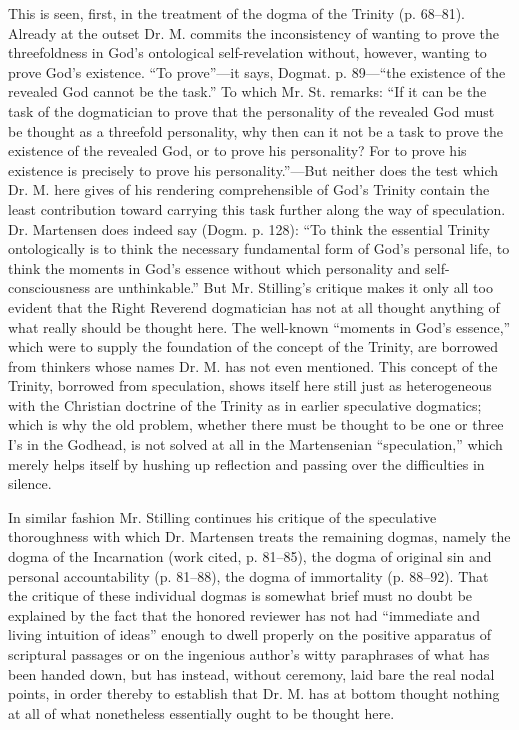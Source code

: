 \documentclass[12pt,a4paper,openany]{book}
\newcommand{\opage}[1]{\marginnote{\footnotesize\textit{[#1]}}}
\begin{document}
This is seen, first, in the treatment of the dogma of the Trinity
(p. 68--81). Already at the outset Dr.
M. commits the inconsistency of wanting to prove the threefoldness in God's
ontological self-revelation without, however, wanting to prove God's
existence. ``To prove''---it says, Dogmat. p. 89---``the
existence of the revealed God cannot be the task.''
To which Mr. St. remarks: ``If it can be the task of
the dogmatician to prove that the personality of the revealed God
must be thought as a threefold personality, why then can
it not be a task to prove the existence of the revealed God,
or to prove his personality? For to prove his
existence is precisely to prove his personality.''---But neither
does the test which Dr. M. here gives of his rendering comprehensible
of God's Trinity contain the least contribution toward
carrying this task further along the way of speculation. Dr. Martensen
does indeed say (Dogm. p. 128): ``To think the essential Trinity
ontologically is to think the necessary fundamental form
\setcounter{footnote}{0}%
\opage{23}of God's personal life, to think the moments in God's
essence without which personality and self-consciousness are unthinkable.''
But Mr. Stilling's critique makes it only all too evident
that the Right Reverend dogmatician has not at all
thought anything of what really should be thought here. The well-known
``moments in God's essence,'' which were to supply the foundation of the concept of the Trinity,
are borrowed from thinkers whose
names Dr. M. has not even mentioned. This concept of the Trinity,
borrowed from speculation, shows itself here still just as
heterogeneous with the Christian doctrine of the Trinity as in earlier
speculative dogmatics; which is why the old
problem, whether there must be thought to be one or three
I's in the Godhead, is not solved at all in the Martensenian
``speculation,'' which merely helps itself by hushing up reflection
and passing over the difficulties in silence.

In similar fashion Mr. Stilling continues his critique
of the speculative thoroughness with which Dr. Martensen
treats the remaining dogmas, namely the dogma of the Incarnation
(work cited, p. 81--85), the dogma of original sin and personal
accountability (p. 81--88), the dogma of immortality
(p. 88--92). That the critique of these individual dogmas is
somewhat brief must no doubt be explained by the fact that the honored
reviewer has not had ``immediate and living intuition of ideas''
enough to dwell properly on the positive apparatus of
scriptural passages or on the ingenious author's witty paraphrases
of what has been handed down, but has instead, without ceremony,
laid bare the real nodal points, in order thereby
to establish that Dr. M. has at bottom thought nothing at all
of what nonetheless essentially ought to be thought here.
\end{document}
